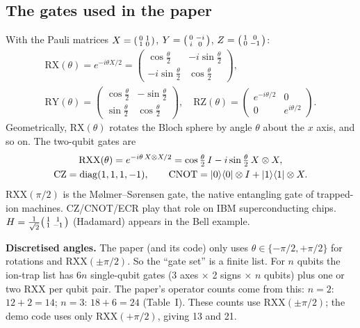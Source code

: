 \documentclass[11pt,a4paper]{article}
\newcommand{\RX}{\mathrm{RX}}\newcommand{\RY}{\mathrm{RY}}\newcommand{\RZ}{\mathrm{RZ}}
\newcommand{\RXX}{\mathrm{RXX}}\newcommand{\CZ}{\mathrm{CZ}}\newcommand{\CNOT}{\mathrm{CNOT}}
\begin{document}
\subsection{The gates used in the paper}
With the Pauli matrices $X=\begin{psmallmatrix}0&1\\1&0\end{psmallmatrix}$, $Y=\begin{psmallmatrix}0&-i\\i&0\end{psmallmatrix}$,
$Z=\begin{psmallmatrix}1&0\\0&-1\end{psmallmatrix}$:
\begin{gather*}
\RX(\theta)=e^{-i\theta X/2}=\begin{pmatrix}\cos\frac\theta2&-i\sin\frac\theta2\\-i\sin\frac\theta2&\cos\frac\theta2\end{pmatrix},\\
\RY(\theta)=\begin{pmatrix}\cos\frac\theta2&-\sin\frac\theta2\\\sin\frac\theta2&\cos\frac\theta2\end{pmatrix},\quad
\RZ(\theta)=\begin{pmatrix}e^{-i\theta/2}&0\\0&e^{i\theta/2}\end{pmatrix}.
\end{gather*}
Geometrically, $\RX(\theta)$ rotates the Bloch sphere by angle $\theta$ about the $x$ axis, and so on. The two-qubit gates are
\begin{gather*}
\RXX(\theta)=e^{-i\theta\,X\otimes X/2}=\cos\tfrac\theta2\,I-i\sin\tfrac\theta2\,X\otimes X,\\
\CZ=\mathrm{diag}(1,1,1,-1),\qquad \CNOT=\ket0\!\bra0\otimes I+\ket1\!\bra1\otimes X.
\end{gather*}
$\RXX(\pi/2)$ is the M{\o}lmer--S{\o}rensen gate, the native entangling gate of trapped-ion machines.
$\CZ$/$\CNOT$/ECR play that role on IBM superconducting chips. $H=\frac1{\sqrt2}\begin{psmallmatrix}1&1\\1&-1\end{psmallmatrix}$
(Hadamard) appears in the Bell example.

\textbf{Discretised angles.} The paper (and its code) only uses $\theta\in\{-\pi/2,+\pi/2\}$ for rotations and
$\RXX(\pm\pi/2)$. So the ``gate set'' is a finite list. For $n$ qubits the ion-trap list has $6n$ single-qubit gates
(3 axes $\times$ 2 signs $\times$ $n$ qubits) plus one or two $\RXX$ per qubit pair. The paper's operator counts
come from this: $n=2$: $12+2=14$; $n=3$: $18+6=24$ (Table~I). These counts use $\RXX(\pm\pi/2)$; the demo code uses only
$\RXX(+\pi/2)$, giving 13 and 21.
\end{document}
